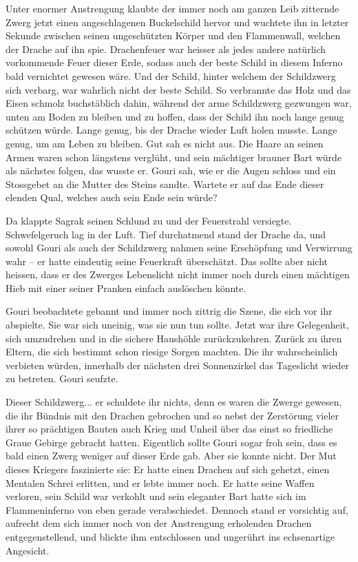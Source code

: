 Unter enormer Anstrengung klaubte der immer noch am ganzen Leib zitternde Zwerg jetzt einen angeschlagenen Buckelschild hervor und wuchtete ihn in letzter Sekunde zwischen seinen ungeschützten Körper und den Flammenwall, welchen der Drache auf ihn spie. Drachenfeuer war heisser als jedes andere natürlich vorkommende Feuer dieser Erde, sodass auch der beste Schild in diesem Inferno bald vernichtet gewesen wäre. Und der Schild, hinter welchem der Schildzwerg sich verbarg, war wahrlich nicht der beste Schild. So verbrannte das Holz und das Eisen schmolz buchstäblich dahin, während der arme Schildzwerg gezwungen war, unten am Boden zu bleiben und zu hoffen, dass der Schild ihn noch lange genug schützen würde. Lange genug, bis der Drache wieder Luft holen musste. Lange genug, um am Leben zu bleiben. Gut sah es nicht aus. Die Haare an seinen Armen waren schon längstens verglüht, und sein mächtiger brauner Bart würde als nächstes folgen, das wusste er. Gouri sah, wie er die Augen schloss und ein Stossgebet an die Mutter des Steins sandte. Wartete er auf das Ende dieser elenden Qual, welches auch sein Ende sein würde?

Da klappte Sagrak seinen Schlund zu und der Feuerstrahl versiegte. Schwefelgeruch lag in der Luft. Tief durchatmend stand der Drache da, und sowohl Gouri als auch der Schildzwerg nahmen seine Erschöpfung und Verwirrung wahr – er hatte eindeutig seine Feuerkraft überschätzt. Das sollte aber nicht heissen, dass er des Zwerges Lebenslicht nicht immer noch durch einen mächtigen Hieb mit einer seiner Pranken einfach auslöschen könnte.

Gouri beobachtete gebannt und immer noch zittrig die Szene, die sich vor ihr abspielte. Sie war sich uneinig, was sie nun tun sollte. Jetzt war ihre Gelegenheit, sich umzudrehen und in die sichere Haushöhle zurückzukehren. Zurück zu ihren Eltern, die sich bestimmt schon riesige Sorgen machten. Die ihr wahrscheinlich verbieten würden, innerhalb der nächsten drei Sonnenzirkel das Tageslicht wieder zu betreten. Gouri seufzte.

Dieser Schildzwerg... er schuldete ihr nichts, denn es waren die Zwerge gewesen, die ihr Bündnis mit den Drachen gebrochen und so nebst der Zerstörung vieler ihrer so prächtigen Bauten auch Krieg und Unheil über das einst so friedliche Graue Gebirge gebracht hatten. Eigentlich sollte Gouri sogar froh sein, dass es bald einen Zwerg weniger auf dieser Erde gab. Aber sie konnte nicht. Der Mut dieses Kriegers faszinierte sie: Er hatte einen Drachen auf sich gehetzt, einen Mentalen Schrei erlitten, und er lebte immer noch. Er hatte seine Waffen verloren, sein Schild war verkohlt und sein eleganter Bart hatte sich im Flammeninferno von eben gerade verabschiedet. Dennoch stand er vorsichtig auf, aufrecht dem sich immer noch von der Anstrengung erholenden Drachen entgegenstellend, und blickte ihm entschlossen und ungerührt ins echsenartige Angesicht.

